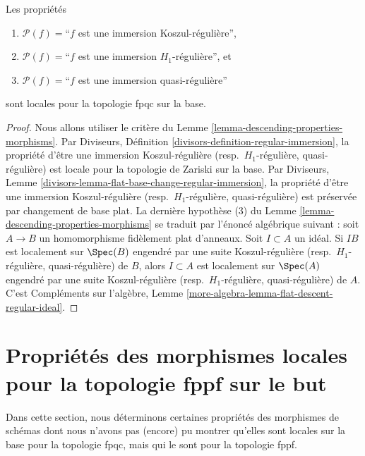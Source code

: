 \begin{lemma}
\label{lemma-descending-property-regular-immersion}
Les propriétés
\begin{enumerate}
\item[] $\mathcal{P}(f) =$``$f$ est une immersion Koszul-régulière'',
\item[] $\mathcal{P}(f) =$``$f$ est une immersion $H_1$-régulière'', et
\item[] $\mathcal{P}(f) =$``$f$ est une immersion quasi-régulière''
\end{enumerate}
sont locales pour la topologie fpqc sur la base.
\end{lemma}

\begin{proof}
Nous allons utiliser le critère du
Lemme \ref{lemma-descending-properties-morphisms}.
Par Diviseurs, Définition \ref{divisors-definition-regular-immersion},
la propriété d'être une immersion Koszul-régulière
(resp.\ $H_1$-régulière, quasi-régulière) est locale pour la topologie de
Zariski sur la base. Par
Diviseurs, Lemme \ref{divisors-lemma-flat-base-change-regular-immersion},
la propriété d'être une immersion Koszul-régulière
(resp.\ $H_1$-régulière, quasi-régulière)
est préservée par changement de base plat.
La dernière hypothèse (3) du
Lemme \ref{lemma-descending-properties-morphisms}
se traduit par l'énoncé algébrique suivant :
soit $A \to B$ un homomorphisme fidèlement plat d'anneaux.
Soit $I \subset A$ un idéal.
Si $IB$ est localement sur $\Spec(B)$ engendré par une suite Koszul-régulière
(resp.\ $H_1$-régulière, quasi-régulière) de $B$, alors $I \subset A$
est localement sur $\Spec(A)$ engendré par une suite Koszul-régulière
(resp.\ $H_1$-régulière, quasi-régulière) de $A$. C'est
Compléments sur l'algèbre,
Lemme \ref{more-algebra-lemma-flat-descent-regular-ideal}.
\end{proof}





\section{Propriétés des morphismes locales pour la topologie fppf sur le but}
\label{section-descending-properties-morphisms-fppf}

\noindent
Dans cette section, nous déterminons certaines propriétés des morphismes de
schémas dont nous n'avons pas (encore) pu montrer qu'elles sont locales sur la
base pour la topologie fpqc, mais qui le sont pour la topologie fppf.

